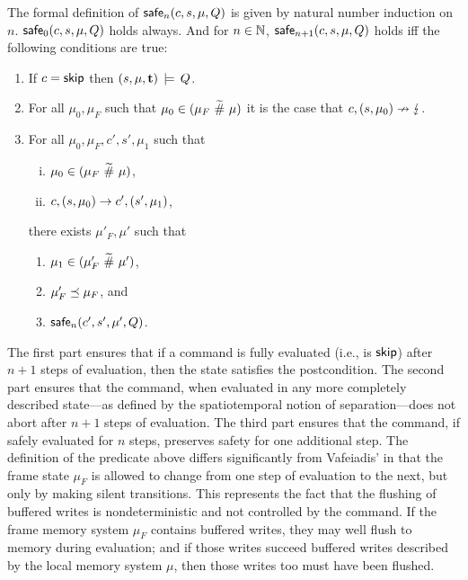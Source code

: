\documentclass[11pt]{report}
\begin{document}
The formal definition of $\mathsf{safe}_{n}(c,s,\mu,Q)$ is given by natural number induction on $n$. $\mathsf{safe}_{0}(c,s,\mu,Q)$ holds always. And for $n \in \mathbb{N}$, $\mathsf{safe}_{n+1}(c,s,\mu,Q)$ holds iff the following conditions are true: \begin{enumerate}
    \item If $c = \operatorname{\mathsf{skip}}$ then $(s,\mu,\mathbf{t}) \,\models\, Q$.

    \item For all $\mu_0,\mu_F$ such that $\mu_0 \in (\mu_F \operatorname{\,\widetilde{\#}\,} \mu)$ it is the case that $c,(s,\mu_0) \nrightarrow \lightning$.

    \item For all $\mu_0,\mu_F,c',s',\mu_1$ such that \begin{enumerate}[(i)]
        \item $\mu_0 \in (\mu_F \operatorname{\,\widetilde{\#}\,} \mu)$,
        \item $c,(s,\mu_0) \rightarrow c',(s',\mu_1)$,
    \end{enumerate} there exists $\mu'_F,\mu'$ such that \begin{enumerate}
        \item $\mu_1 \in (\mu'_F \operatorname{\,\widetilde{\#}\,} \mu')$,
        \item $\mu'_F \preceq \mu_F$, and
        \item $\mathsf{safe}_{n}(c',s',\mu',Q)$.
    \end{enumerate}

\end{enumerate}

The first part ensures that if a command is fully evaluated (i.e., is $\operatorname{\mathsf{skip}}$) after $n+1$ steps of evaluation, then the state satisfies the postcondition. The second part ensures that the command, when evaluated in any more completely described state---as defined by the spatiotemporal notion of separation---does not abort after $n+1$ steps of evaluation. The third part ensures that the command, if safely evaluated for $n$ steps, preserves safety for one additional step. The definition of the predicate above differs significantly from Vafeiadis' in that the frame state $\mu_F$ is allowed to change from one step of evaluation to the next, but only by making silent transitions. This represents the fact that the flushing of buffered writes is nondeterministic and not controlled by the command. If the frame memory system $\mu_F$ contains buffered writes, they may well flush to memory during evaluation; and if those writes succeed buffered writes described by the local memory system $\mu$, then those writes too must have been flushed. 
\end{document}
